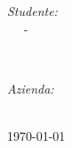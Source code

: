 \begin{titlepage}
    \vspace{1.5cm}
    
    \begin{minipage}{0.4\textwidth}
        \begin{flushleft} \large
            \emph{Studente:}\\
            \nomeStudente\ \textsc{\cognomeStudente\ } - \matricolaStudente
        \end{flushleft}
    \end{minipage}
    ~
    \begin{minipage}{0.4\textwidth}
        \begin{flushright} \large
            \emph{Azienda:} \\
            \ragioneSocAzienda
        \end{flushright}
    \end{minipage}\\[1cm]
    
    
    {\large \today}\\[2cm]
    
    
    \vfill 
    
\end{titlepage}